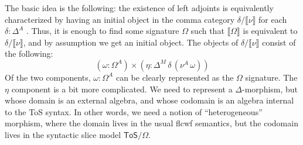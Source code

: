 \documentclass[12pt,a4paper,twoside,openany]{book}
\theoremstyle{remark}
\theoremstyle{definition}
\theoremstyle{theorem}
\newcommand{\ToS}{\mathsf{ToS}}
\newcommand{\llb}{\llbracket}
\newcommand{\rrb}{\rrbracket}
\newcommand{\sem}[1]{\llb#1\rrb}
\begin{document}
The basic idea is the following: the existence of left adjoints is equivalently
characterized by having an initial object in the comma category
$\delta/\sem{\nu}$ for each $\delta : \Delta^A$
\cite[Section~IV]{maclane98categories}. Thus, it is enough to find some
signature $\Omega$ such that $\sem{\Omega}$ is equivalent to
$\delta/\sem{\nu}$, and by assumption we get an initial object. The objects
of $\delta/\sem{\nu}$ consist of the following:
\[
  (\omega : \Omega^A) \times (\eta : \Delta^M\,\delta\,(\nu^A\,\omega))
\]
Of the two components, $\omega : \Omega^A$ can be clearly represented as the
$\Omega$ signature. The $\eta$ component is a bit
more complicated. We need to represent a $\Delta$-morphism, but whose domain is
an external algebra, and whose codomain is an algebra internal to the ToS
syntax. In other words, we need a notion of ``heterogeneous'' morphism, where
the domain lives in the usual flcwf semantics, but the codomain lives in the
syntactic slice model $\ToS/\Omega$.
\end{document}
